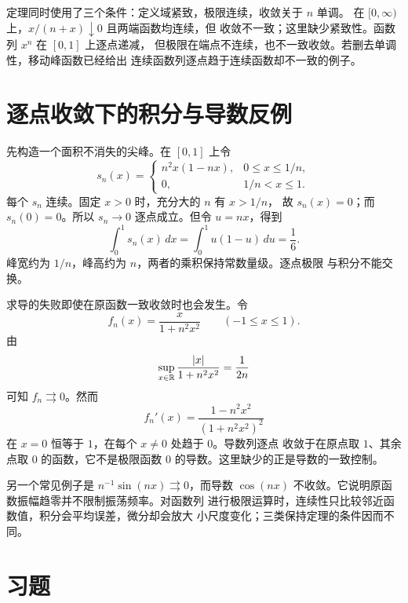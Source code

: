 定理同时使用了三个条件：定义域紧致，极限连续，收敛关于 \(n\) 单调。
在 \([0,\infty)\) 上，\(x/(n+x)\downarrow0\) 且两端函数均连续，但
收敛不一致；这里缺少紧致性。函数列 \(x^n\) 在 \([0,1]\) 上逐点递减，
但极限在端点不连续，也不一致收敛。若删去单调性，移动峰函数已经给出
连续函数列逐点趋于连续函数却不一致的例子。

\section{逐点收敛下的积分与导数反例}

先构造一个面积不消失的尖峰。在 \([0,1]\) 上令
\[
 s_n(x)=
 \begin{cases}
 n^2x(1-nx),&0\le x\le1/n,\\
 0,&1/n<x\le1.
 \end{cases}
\]
每个 \(s_n\) 连续。固定 \(x>0\) 时，充分大的 \(n\) 有 \(x>1/n\)，
故 \(s_n(x)=0\)；而 \(s_n(0)=0\)。所以 \(s_n\to0\) 逐点成立。但令
\(u=nx\)，得到
\[
 \int_0^1s_n(x)\,dx
 =\int_0^1u(1-u)\,du=\frac16.
\]
峰宽约为 \(1/n\)，峰高约为 \(n\)，两者的乘积保持常数量级。逐点极限
与积分不能交换。

求导的失败即使在原函数一致收敛时也会发生。令
\[
 f_n(x)=\frac{x}{1+n^2x^2}\qquad(-1\le x\le1).
\]
由
\[
 \sup_{x\in\mathbb{R}}\frac{|x|}{1+n^2x^2}=\frac1{2n}
\]
可知 \(f_n\rightrightarrows0\)。然而
\[
 f_n'(x)=\frac{1-n^2x^2}{(1+n^2x^2)^2}
\]
在 \(x=0\) 恒等于 \(1\)，在每个 \(x\ne0\) 处趋于 \(0\)。导数列逐点
收敛于在原点取 \(1\)、其余点取 \(0\) 的函数，它不是极限函数 \(0\)
的导数。这里缺少的正是导数的一致控制。

另一个常见例子是 \(n^{-1}\sin(nx)\rightrightarrows0\)，而导数
\(\cos(nx)\) 不收敛。它说明原函数振幅趋零并不限制振荡频率。对函数列
进行极限运算时，连续性只比较邻近函数值，积分会平均误差，微分却会放大
小尺度变化；三类保持定理的条件因而不同。

\section*{习题}

